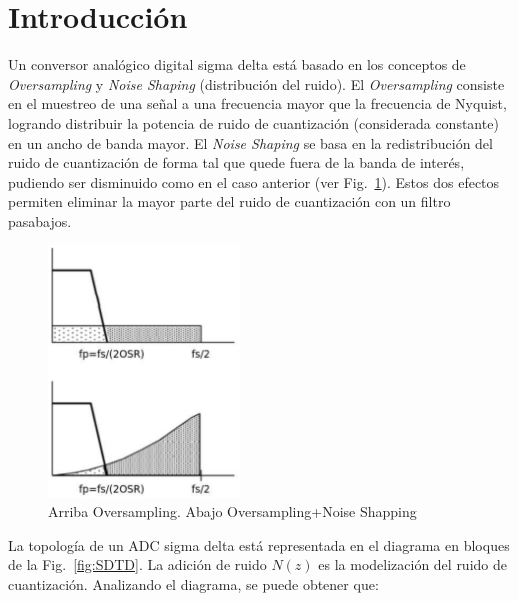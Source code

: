 \documentclass[a4paper,conference]{IEEEtran}
\begin{document}
\section{Introducci\'on}
Un conversor analógico digital sigma delta est\'a basado en los conceptos de \textit{Oversampling} y \textit{Noise Shaping} (distribuci\'on del ruido). El \textit{Oversampling} consiste en el muestreo de una señal a una frecuencia mayor que la frecuencia de Nyquist, logrando distribuir la potencia de ruido de cuantización (considerada constante) en un ancho de banda mayor. El \textit{Noise Shaping} se basa en la redistribución del ruido de cuantizaci\'on de forma tal que quede fuera de la banda de inter\'es, pudiendo ser disminuido como en el caso anterior (ver Fig.~\ref{fig:NS}). Estos dos efectos permiten eliminar la mayor parte del ruido de cuantización con un filtro pasabajos.

\begin{figure}[!b]
\centering
\includegraphics[width=2in]{Noise_Shaping.eps}
\caption{Arriba Oversampling. Abajo Oversampling+Noise Shapping}
\label{fig:NS}
\end{figure}

La topolog\'ia de un ADC sigma delta está representada en el diagrama en bloques de la Fig.~\ref{fig:SDTD}. La adición de ruido $N(z)$ es la modelización del ruido de cuantización. Analizando el diagrama, se puede obtener que:
\end{document}
